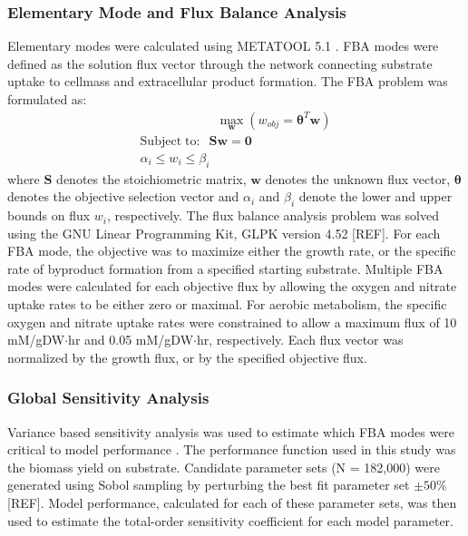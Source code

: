 \documentclass[10pt,twocolumn,twoside,final]{IEEEtran}
\begin{document}
\noindent\subsubsection*{Elementary Mode and Flux Balance Analysis}
Elementary modes were calculated using METATOOL 5.1 \cite{2006_vonKamp_Metatool}.
FBA modes were defined as the solution flux vector through the network connecting substrate uptake to cellmass and extracellular product formation.
The FBA problem was formulated as:
\begin{equation}
 \begin{multlined}
	\qquad \qquad \qquad \max_{\boldsymbol{w}}{} \! \left( w_{obj} = \mathbf{\theta}^T \boldsymbol{w} \right) \\
	\mathrm{Subject \; to:}
	 \; \; \mathbf{S}\mathbf{w}=\mathbf{0} \\
\alpha_i \leq w_i \leq \beta_i  \qquad
 \end{multlined}
\end{equation}
where $\mathbf{S}$ denotes the stoichiometric matrix, $\mathbf{w}$ denotes the unknown flux vector, $\boldsymbol{\theta}$ denotes the objective selection vector
and $\alpha_i$ and $\beta_i$ denote the lower and upper bounds on flux $w_{i}$, respectively.
The flux balance analysis problem was solved using the GNU Linear Programming Kit, GLPK version 4.52 [REF].
For each FBA mode, the objective was to maximize either the growth rate, or the specific rate of byproduct formation from a specified starting substrate.
Multiple FBA modes were calculated for each objective flux by allowing the oxygen and nitrate uptake rates to be either zero or maximal.
For aerobic metabolism, the specific oxygen and nitrate uptake rates were constrained to allow a maximum flux of 10 mM/gDW$\cdot$hr and 0.05 mM/gDW$\cdot$hr, respectively.
Each flux vector was normalized by the growth flux, or by the specified objective flux.

\subsubsection*{Global Sensitivity Analysis}
Variance based sensitivity analysis was used to estimate which FBA modes were critical to model performance \cite{2010_saltelli}.
The performance function used in this study was the biomass yield on substrate.
Candidate parameter sets (N = 182,000) were generated using Sobol sampling by perturbing the best fit parameter set $\pm50\%$ [REF].
Model performance, calculated for each of these parameter sets, was then used to estimate the total-order sensitivity coefficient for each model parameter.
\end{document}
